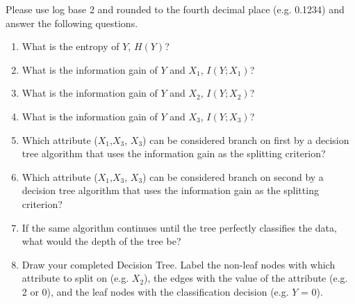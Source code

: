  Please use log base 2 and rounded to the fourth decimal place (e.g. 0.1234) and answer the following questions.
\begin{enumerate}

\item {}  What is the entropy of $Y$, $H(Y)$? 
\\
\item {}  What is the  information gain of $Y$ and $X_1$, $I(Y;X_1)$? 
\\
\item {}  What is the information gain of $Y$ and $X_2$, $I(Y;X_2)$? 
\\
\item {}  What is the  information gain of $Y$ and $X_3$, $I(Y;X_3)$? 
\\
\item {}  Which attribute ($X_1$,$X_3$, $X_3$) can be considered  branch on first by a decision tree algorithm  that uses the information gain as the splitting criterion? \\
\item {}  Which attribute ($X_1$,$X_3$, $X_3$) can be considered  branch on second by a decision tree algorithm  that uses the information gain as the splitting criterion? \\



\item {} If the same algorithm continues until the tree perfectly classifies the data, what would the depth of the tree be? \\



\item {} Draw your completed Decision Tree. Label the non-leaf nodes with which attribute to split on (e.g. $X_2$), the edges with the value of the attribute (e.g. 2 or 0), and the leaf nodes with the classification decision (e.g. $Y$ = 0). \\


\end{enumerate}
